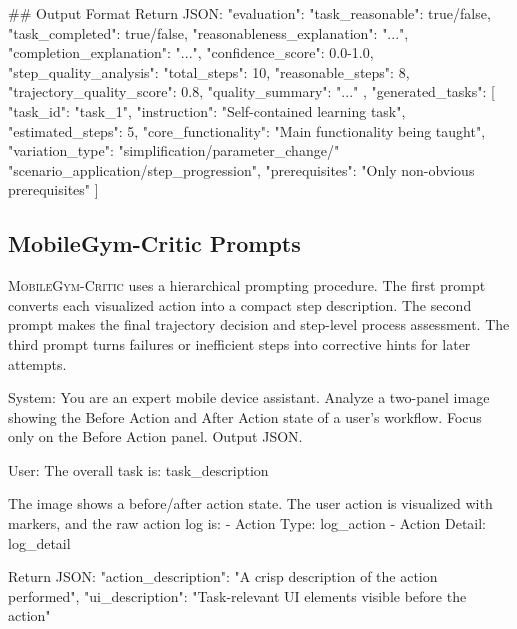 \documentclass{llmxive}
\providecommand{\critic}{\textsc{MobileGym-Critic}\xspace}
\begin{document}
\begin{promptlistingbox}
## Output Format
Return JSON:
{
  "evaluation": {
    "task_reasonable": true/false,
    "task_completed": true/false,
    "reasonableness_explanation": "...",
    "completion_explanation": "...",
    "confidence_score": 0.0-1.0,
    "step_quality_analysis": {
      "total_steps": 10,
      "reasonable_steps": 8,
      "trajectory_quality_score": 0.8,
      "quality_summary": "..."
    }
  },
  "generated_tasks": [
    {
      "task_id": "task_1",
      "instruction": "Self-contained learning task",
      "estimated_steps": 5,
      "core_functionality": "Main functionality being taught",
      "variation_type": "simplification/parameter_change/"
                        "scenario_application/step_progression",
      "prerequisites": "Only non-obvious prerequisites"
    }
  ]
}
\end{promptlistingbox}

\subsection{MobileGym-Critic Prompts}
\label{sec:critic_prompts}

\critic uses a hierarchical prompting procedure. The first prompt converts each visualized action into a compact step description. The second prompt makes the final trajectory decision and step-level process assessment. The third prompt turns failures or inefficient steps into corrective hints for later attempts.

\begin{promptlistingbox}
System:
You are an expert mobile device assistant. Analyze a two-panel image
showing the Before Action and After Action state of a user's workflow.
Focus only on the Before Action panel. Output JSON.

User:
The overall task is: {task_description}

The image shows a before/after action state. The user action is
visualized with markers, and the raw action log is:
- Action Type: {log_action}
- Action Detail: {log_detail}

Return JSON:
{
  "action_description": "A crisp description of the action performed",
  "ui_description": "Task-relevant UI elements visible before the action"
}
\end{promptlistingbox}
\end{document}
